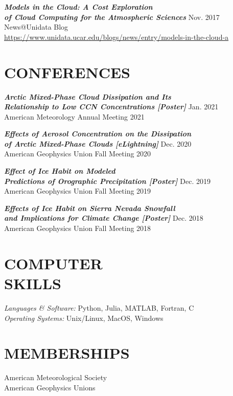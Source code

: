 \documentclass[margin]{res}
\begin{document}
\begin{resume}
                
                {\sl \textbf{Models in the Cloud: A Cost Exploration \\ of Cloud Computing for the Atmospheric Sciences}} \hfill Nov. 2017 \\
                News@Unidata Blog \\
                \href{https://www.unidata.ucar.edu/blogs/news/entry/models-in-the-cloud-a}{https://www.unidata.ucar.edu/blogs/news/entry/models-in-the-cloud-a}


\section{CONFERENCES}

                {\sl \textbf{Arctic Mixed-Phase Cloud Dissipation and Its \\ Relationship to Low CCN Concentrations [Poster]}} \hfill Jan. 2021\\
                American Meteorology Annual Meeting 2021

                {\sl \textbf{Effects of Aerosol Concentration  on the Dissipation \\ of Arctic Mixed-Phase Clouds  [eLightning]}} \hfill Dec. 2020 \\
                American Geophysics Union Fall Meeting 2020
                
                {\sl \textbf{Effect of Ice Habit on Modeled \\ Predictions of Orographic Precipitation [Poster]}} \hfill Dec. 2019 \\
                American Geophysics Union Fall Meeting 2019

                {\sl \textbf{Effects of Ice Habit on Sierra Nevada Snowfall \\ and Implications for Climate Change [Poster]}} \hfill Dec. 2018 \\
                American Geophysics Union Fall Meeting 2018
                
                \section{COMPUTER \\ SKILLS} 
                {\sl Languages \& Software:} Python, Julia, MATLAB, Fortran, C \\
                {\sl Operating Systems:} Unix/Linux, MacOS, Windows

\section{MEMBERSHIPS}            
                {American Meteorological Society} \\
                {American Geophysics Unions}


\end{resume}
\end{document}
